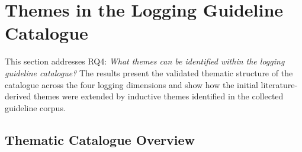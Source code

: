 \clearpage
\section{Themes in the Logging Guideline Catalogue}
\label{sec:results-themes}
This section addresses RQ4: \textit{What themes can be identified within the
logging guideline catalogue?}
The results present the validated thematic structure of the catalogue across the four
logging dimensions and show how the initial literature-derived themes were
extended by inductive themes identified in the collected guideline corpus.

\subsection{Thematic Catalogue Overview}

